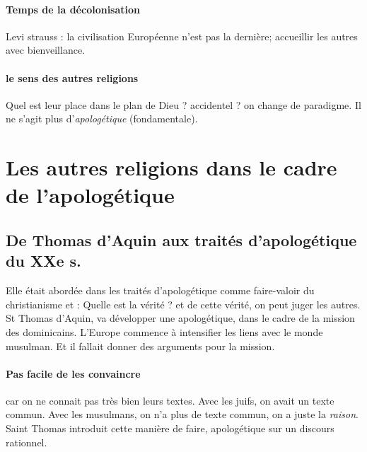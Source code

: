 \paragraph{Temps de la décolonisation} Levi strauss : la civilisation Européenne n'est pas la dernière; accueillir les autres avec bienveillance.

\paragraph{le sens des autres religions} Quel est leur place dans le plan de Dieu ? accidentel ?
on change de paradigme. Il ne s'agit plus d'\emph{apologétique} (fondamentale).

\section{Les autres religions dans le cadre de l’apologétique}
\subsection{De Thomas d’Aquin aux traités d’apologétique du XXe s.}
 

Elle était abordée dans les traités d'apologétique comme faire-valoir du christianisme et : 
Quelle est la vérité ? et de cette vérité, on peut juger les autres.
St Thomas d'Aquin,  va développer une apologétique, dans le cadre de la mission des dominicains. L'Europe commence à intensifier les liens avec le monde musulman. Et il fallait donner des arguments pour la mission. 
\paragraph{Pas facile de les convaincre} car on ne connait pas très bien leurs textes. Avec les juifs, on avait un texte commun. Avec les musulmans, on n'a plus de texte commun, on a juste la \emph{raison}. Saint Thomas introduit cette manière de faire, apologétique sur un discours rationnel.
